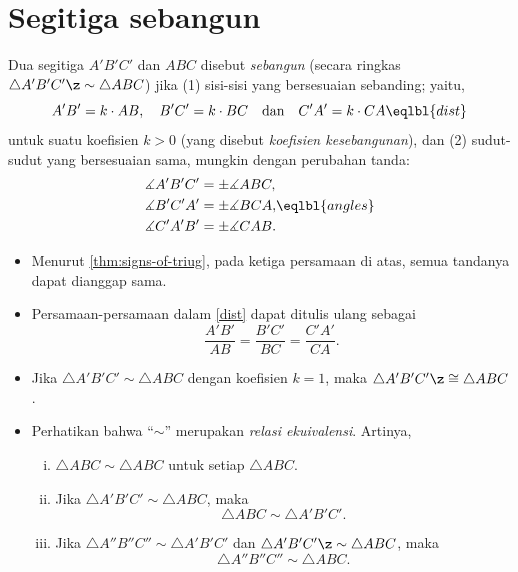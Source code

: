 \chapter[Segitiga sebangun]{Segitiga sebangun}\label{chap:parallel}

Dua segitiga $A' B' C'$ dan $A B C$ disebut
\emph{sebangun} (secara ringkas $\triangle A' B' C'\z\sim\triangle A B C$) jika (1) sisi-sisi yang bersesuaian sebanding;
yaitu,
$$A' B'
=
k\cdot A B,
\quad
B' C'=k\cdot B C
\quad
\text{dan}
\quad
C' A'
=
k\cdot C A
\eqlbl{dist}
$$
untuk suatu koefisien $k>0$ (yang disebut \emph{koefisien kesebangunan}), dan (2) sudut-sudut yang bersesuaian sama, mungkin dengan perubahan tanda:
$$
\begin{aligned}
\measuredangle A' B' C'&=\pm\measuredangle A B C,
\\
\measuredangle B' C' A'&=\pm\measuredangle B C A,
\\
\measuredangle C' A' B'&=\pm\measuredangle CAB.
\end{aligned}
\eqlbl{angles}
$$

\begin{itemize}
\item Menurut \ref{thm:signs-of-triug}, pada ketiga persamaan di atas, semua tandanya dapat dianggap sama.

\item Persamaan-persamaan dalam \ref{dist} dapat ditulis ulang sebagai
\[\frac{A'B'}{AB}=\frac{B'C'}{BC}=\frac{C'A'}{CA}.\]

\item Jika $\triangle A' B' C'\sim\triangle A B C$ dengan koefisien $k=1$,
 maka $\triangle A' B' C'\z\cong\triangle A B C$.

\item Perhatikan bahwa ``$\sim$'' merupakan
\emph{relasi ekuivalensi}.
Artinya,
\begin{enumerate}[(i)]
\item $\triangle A B C\sim\triangle A B C$
untuk setiap $\triangle A B C$.
\item Jika $\triangle A' B' C'\sim\triangle A B C$, maka
$$\triangle A B C\sim\triangle A' B' C'.$$
\item Jika $\triangle A'' B'' C''\sim\triangle A' B' C'$ dan $\triangle A' B' C'\z\sim\triangle A B C$, maka
$$\triangle A'' B'' C''\sim\triangle A B C.$$
\end{enumerate}
\end{itemize}

